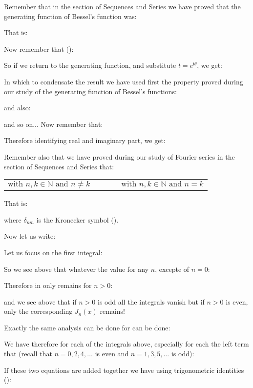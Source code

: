 	Remember that in the section of Sequences and Series we have proved that the generating function of Bessel's function was:
	
	That is:
	
	Now remember that ():
	
	So if we return to the generating function, and substitute $t=e^{\mathrm{i}\theta}$, we get:
	
	In which to condensate the result we have used first the property proved during our study of the generating function of Bessel's functions:
	
	and also:
	
	and so on...
	Now remember that:
	
	Therefore identifying real and imaginary part, we get:
	
	Remember also that we have proved during our study of Fourier series in the section of Sequences and Series that:
	
	\begin{center}
	\begin{tabular}{ccc}
	$\text{with }n,k\in \mathbb{N}\text{ and }n\ne k$
	&$\qquad$&
	$\text{with }n,k\in \mathbb{N}\text{ and }n = k$
	\end{tabular}
	\end{center}
	That is:
	
	where $\delta_{nm}$ is the Kronecker symbol ().
	
	Now let us write:
	
	Let us focus on the first integral:
	
	So we see above that whatever the value for any $n$, excepte of $n=0$:
	
	Therefore in only remains for $n>0$:
	
	and we see above that if $n>0$ is odd all the integrals vanish but if $n>0$ is even, only the corresponding $J_n(x)$ remains!
	
	Exactly the same analysis can be done for can be done:
	
	We have therefore for each of the integrals above, especially for each the left term that (recall that $n=0,2,4,\ldots$ is even and $n=1,3,5,\ldots$ is odd):
	
	If these two equations are added together we have using trigonometric identities ():
	
